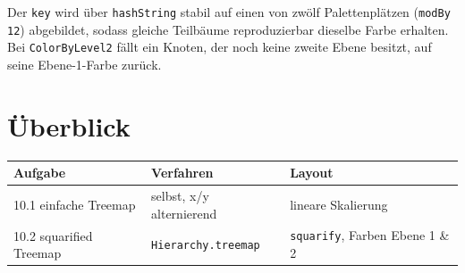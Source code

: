 \documentclass[11pt,a4paper]{article}
\begin{document}
Der \texttt{key} wird über \texttt{hashString} stabil auf einen von zwölf
Palettenplätzen (\texttt{modBy 12}) abgebildet, sodass gleiche Teilbäume
reproduzierbar dieselbe Farbe erhalten. Bei \texttt{ColorByLevel2} fällt ein
Knoten, der noch keine zweite Ebene besitzt, auf seine Ebene-1-Farbe zurück.

\section*{Überblick}

\begin{center}
\begin{tabular}{lll}
\toprule
Aufgabe & Verfahren & Layout \\
\midrule
10.1 einfache Treemap & selbst, x/y alternierend & lineare Skalierung \\
10.2 squarified Treemap & \texttt{Hierarchy.treemap} & \texttt{squarify}, Farben Ebene 1 \& 2 \\
\bottomrule
\end{tabular}
\end{center}
\end{document}
